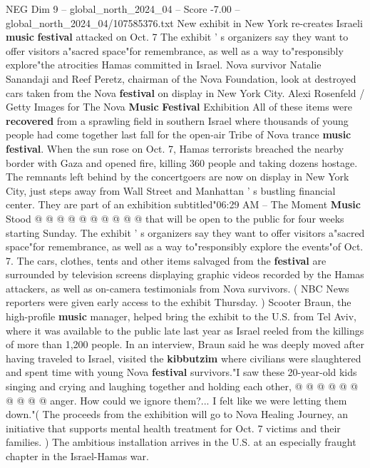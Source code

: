 \begin{textsample}{NEG Dim 9 – global\_north\_2024\_04 – Score -7.00 – global\_north\_2024\_04/107585376.txt}  \label{ex:f9_neg_269}
New exhibit in New York re-creates Israeli \textbf{music} \textbf{festival} attacked on Oct. 7 The exhibit ' s organizers say they want to offer visitors a"sacred space"for remembrance, as well as a way to"responsibly explore"the atrocities Hamas committed in Israel.
Nova survivor Natalie Sanandaji and Reef Peretz, chairman of the Nova Foundation, look at destroyed cars taken from the Nova \textbf{festival} on display in New York City.
Alexi Rosenfeld / Getty Images for The Nova \textbf{Music} \textbf{Festival} Exhibition All of these items were \textbf{recovered} from a sprawling field in southern Israel where thousands of young people had come together last fall for the open-air Tribe of Nova trance \textbf{music} \textbf{festival}.
When the sun rose on Oct. 7, Hamas terrorists breached the nearby border with Gaza and opened fire, killing 360 people and taking dozens hostage.
The remnants left behind by the concertgoers are now on display in New York City, just steps away from Wall Street and Manhattan ' s bustling financial center.
They are part of an exhibition subtitled"06:29 AM -- The Moment \textbf{Music} Stood @ @ @ @ @ @ @ @ @ @ that will be open to the public for four weeks starting Sunday.
The exhibit ' s organizers say they want to offer visitors a"sacred space"for remembrance, as well as a way to"responsibly explore the events"of Oct. 7.
The cars, clothes, tents and other items salvaged from the \textbf{festival} are surrounded by television screens displaying graphic videos recorded by the Hamas attackers, as well as on-camera testimonials from Nova survivors. ( NBC News reporters were given early access to the exhibit Thursday. ) Scooter Braun, the high-profile \textbf{music} manager, helped bring the exhibit to the U.S. from Tel Aviv, where it was available to the public late last year as Israel reeled from the killings of more than 1,200 people.
In an interview, Braun said he was deeply moved after having traveled to Israel, visited the \textbf{kibbutzim} where civilians were slaughtered and spent time with young Nova \textbf{festival} survivors."I saw these 20-year-old kids singing and crying and laughing together and holding each other, @ @ @ @ @ @ @ @ @ @ anger.
How could we ignore them?...
I felt like we were letting them down."( The proceeds from the exhibition will go to Nova Healing Journey, an initiative that supports mental health treatment for Oct. 7 victims and their families. ) The ambitious installation arrives in the U.S. at an especially fraught chapter in the Israel-Hamas war.

\end{textsample}
